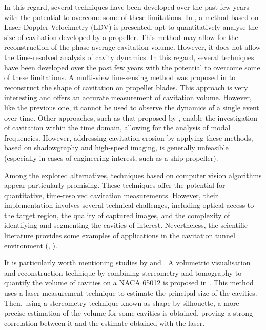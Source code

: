 In this regard, several techniques have been developed over the past few years with the potential to overcome some of these limitations. In \cite{Capone2024}, a method based on Laser Doppler Velocimetry (LDV) is presented, apt to quantitatively analyse the size of cavitation developed by a propeller. This method may allow for the reconstruction of the phase average cavitation volume. However, it does not allow the time-resolved analysis of cavity dynamics. 
In this regard, several techniques have been developed over the past few years with the potential to overcome some of these limitations. 
A multi-view line-sensing method was proposed in \cite{Shiraishi2024} to reconstruct the shape of cavitation on propeller blades. This approach is very interesting and offers an accurate measurement of cavitation volume. However, like the previous one, it cannot be used to observe the dynamics of a single event over time. 
Other approaches, such as that proposed by \cite{Vijayan2023}, enable the investigation of cavitation within the time domain, allowing for the analysis of modal frequencies. However, addressing cavitation erosion by applying these methods, based on shadowgraphy and high-speed imaging, is generally unfeasible (especially in cases of engineering interest, such as a ship propeller).

Among the explored alternatives, techniques based on computer vision algorithms appear particularly promising.
These techniques offer the potential for quantitative, time-resolved cavitation measurements. However, their implementation involves several technical challenges, including optical access to the target region, the quality of captured images, and the complexity of identifying and segmenting the cavities of interest.  
Nevertheless, the scientific literature provides some examples of applications in the cavitation tunnel environment (\cite{Franzosi2023}, \cite{Ebert2019}).

It is particularly worth mentioning studies by \cite{Pereira1998} and \cite{Savio2011}.
A volumetric visualisation and reconstruction technique by combining stereometry and tomography to quantify the volume of cavities on a NACA 65012 is proposed in \cite{Pereira1998}.
This method uses a laser measurement technique to estimate the principal size of the cavities. Then, using a stereometry technique known as shape by silhouette, a more precise estimation of the volume for some cavities is obtained, proving a strong correlation between it and the estimate obtained with the laser.

